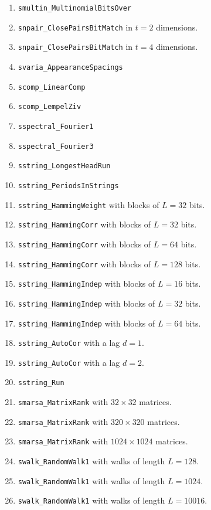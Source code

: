 \begin{enumerate}
  \item {\tt smultin\_MultinomialBitsOver}
  \item {\tt snpair\_ClosePairsBitMatch} in $t=2$ dimensions.
  \item {\tt snpair\_ClosePairsBitMatch} in $t=4$ dimensions.
  \item {\tt svaria\_AppearanceSpacings}
  \item {\tt scomp\_LinearComp}
  \item {\tt scomp\_LempelZiv}
  \item {\tt sspectral\_Fourier1}
  \item {\tt sspectral\_Fourier3}
  \item {\tt sstring\_LongestHeadRun}
  \item {\tt sstring\_PeriodsInStrings}
  \item {\tt sstring\_HammingWeight} with blocks of $L = 32$ bits.
  \item {\tt sstring\_HammingCorr} with blocks of $L = 32$ bits.
  \item {\tt sstring\_HammingCorr} with blocks of $L = 64$ bits.
  \item {\tt sstring\_HammingCorr} with blocks of $L = 128$ bits.
  \item {\tt sstring\_HammingIndep} with blocks of $L = 16$ bits.
  \item {\tt sstring\_HammingIndep} with blocks of $L = 32$ bits.
  \item {\tt sstring\_HammingIndep} with blocks of $L = 64$ bits.
  \item {\tt sstring\_AutoCor} with a lag $d = 1$.
  \item {\tt sstring\_AutoCor} with a lag $d = 2$.
  \item {\tt sstring\_Run}
  \item {\tt smarsa\_MatrixRank} with $32 \times 32$ matrices.
  \item {\tt smarsa\_MatrixRank} with $320 \times 320$ matrices.
  \item {\tt smarsa\_MatrixRank} with $1024 \times 1024$ matrices.
  \item {\tt swalk\_RandomWalk1} with walks of length $L = 128$.
  \item {\tt swalk\_RandomWalk1} with walks of length $L = 1024$.
  \item {\tt swalk\_RandomWalk1} with walks of length $L = 10016$.
\end{enumerate}

\code

